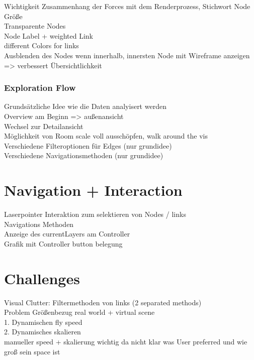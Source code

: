 Wichtigkeit Zusammenhang der Forces mit dem Renderprozess, Stichwort Node Größe\\
Transparente Nodes\\
Node Label + weighted Link\\
different Colors for links\\
Ausblenden des Nodes wenn innerhalb, innersten Node mit Wireframe anzeigen => verbessert Übersichtlichkeit\\

\subsubsection{Exploration Flow}

Grundsätzliche Idee wie die Daten analyisert werden\\
Overview am Beginn => außenansicht \\
Wechsel zur Detailansicht\\
Möglichkeit von Room scale voll ausschöpfen, walk around the vis\\
Verschiedene Filteroptionen für Edges (nur grundidee)\\
Verschiedene Navigationsmethoden (nur grundidee)\\

\section{Navigation + Interaction}

Laserpointer Interaktion zum selektieren von Nodes / links\\
Navigations Methoden\\
Anzeige des currentLayers am Controller\\
Grafik mit Controller button belegung\\

\section{Challenges}

Visual Clutter: Filtermethoden von links (2 separated methods)\\

Problem Größenbezug real world + virtual scene\\
1. Dynamischen fly speed\\
2. Dynamisches skalieren\\
manueller speed + skalierung wichtig da nicht klar was User preferred und wie groß sein space ist\\ 


